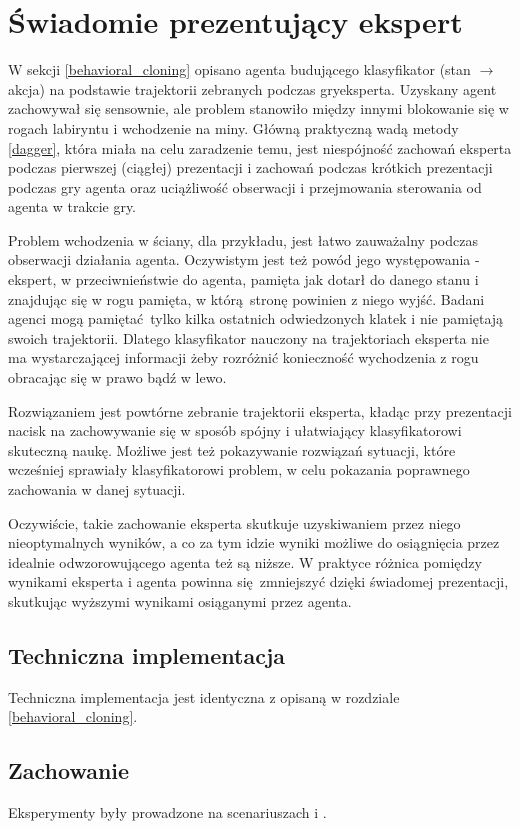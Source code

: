 \section{Świadomie prezentujący ekspert}\label{presenting_expert}
W sekcji \ref{behavioral_cloning} opisano agenta budującego klasyfikator (stan $\to$ akcja) na podstawie trajektorii zebranych podczas gryeksperta. Uzyskany agent zachowywał się sensownie, ale problem stanowiło między innymi blokowanie się w rogach labiryntu i wchodzenie na miny. Główną praktyczną wadą metody \ref{dagger}, która miała na celu zaradzenie temu, jest niespójność zachowań eksperta podczas pierwszej (ciągłej) prezentacji i zachowań podczas krótkich prezentacji podczas gry agenta oraz uciążliwość obserwacji i przejmowania sterowania od agenta w trakcie gry.

Problem wchodzenia w ściany, dla przykładu, jest łatwo zauważalny podczas obserwacji działania agenta. Oczywistym jest też powód jego występowania - ekspert, w przeciwnieństwie do agenta, pamięta jak dotarł do danego stanu i znajdując się w rogu pamięta, w którą stronę powinien z niego wyjść. Badani agenci mogą pamiętać tylko kilka ostatnich odwiedzonych klatek i nie pamiętają swoich trajektorii. Dlatego klasyfikator nauczony na trajektoriach eksperta nie ma wystarczającej informacji żeby rozróżnić konieczność wychodzenia z rogu obracając się w prawo bądź w lewo.

Rozwiązaniem jest powtórne zebranie trajektorii eksperta, kładąc przy prezentacji nacisk na zachowywanie się w sposób spójny i ułatwiający klasyfikatorowi skuteczną naukę. Możliwe jest też pokazywanie rozwiązań sytuacji, które wcześniej sprawiały klasyfikatorowi problem, w celu pokazania poprawnego zachowania w danej sytuacji.

Oczywiście, takie zachowanie eksperta skutkuje uzyskiwaniem przez niego nieoptymalnych wyników, a co za tym idzie wyniki możliwe do osiągnięcia przez idealnie odwzorowującego agenta też są niższe. W praktyce różnica pomiędzy wynikami eksperta i agenta powinna się zmniejszyć dzięki świadomej prezentacji, skutkując wyższymi wynikami osiąganymi przez agenta.

\subsection{Techniczna implementacja}

Techniczna implementacja jest identyczna z opisaną w rozdziale \ref{behavioral_cloning}.

\subsection{Zachowanie}
Eksperymenty były prowadzone na scenariuszach  i .

